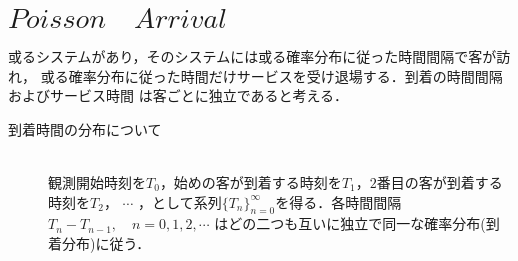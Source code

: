 \documentclass[a4j,papersize,disablejfam,slide,14pt]{jsarticle}
\begin{document}
\section{$Poisson\quad Arrival$}
    \begin{screen}
    或るシステムがあり，そのシステムには或る確率分布に従った時間間隔で客が訪れ，
    或る確率分布に従った時間だけサービスを受け退場する．到着の時間間隔およびサービス時間
    は客ごとに独立であると考える．
    \end{screen}
    \begin{description}
    	\item[到着時間の分布について]\mbox{}\\
    	観測開始時刻を$T_0$，始めの客が到着する時刻を$T_1$，$2$番目の客が到着する時刻を$T_2$，
    	$\cdots$ ，として系列$\{T_n\}_{n=0}^{\infty}$を得る．各時間間隔$T_n - T_{n-1},\quad n=0,1,2,\cdots$
    	はどの二つも互いに独立で同一な確率分布(到着分布)に従う．
    \end{description}
\end{document}
